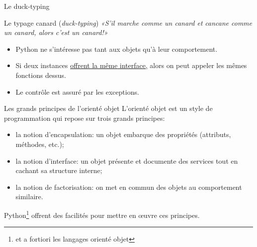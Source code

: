 \documentclass[dvipsnames]{beamer}
\begin{document}
\begin{frame}
    [fragile]{Le duck-typing}
    \begin{alertblock}
        {Le typage canard (\emph{duck-typing})}
        \emph{«S'il marche comme un canard et cancane comme un canard, alors
            c'est un canard!»}
    \end{alertblock}
    \vspace{-1em}
    \begin{itemize}
        \item Python ne s'intéresse pas tant aux objets qu'à leur comportement.
        \item Si deux instances \alert{\underline{{\normalfont \color{black}
                              offrent la même} interface,}} alors on peut
              appeler les mêmes fonctions dessus.
        \item Le contrôle est assuré par les exceptions.\\
              \mbox{}\hfill\PointingHand{} \quad\mbox{}
    \end{itemize}

\end{frame}

\begin{frame}
    [fragile]{Les grands principes de l'orienté objet}
    L'orienté objet est un style de programmation qui repose sur trois
    grands principes:
    \begin{itemize}
        \item la notion d'\alert{encapsulation}: un objet embarque des
              propriétés (attributs, méthodes, etc.);
        \item la notion d'\alert{interface}: un objet présente et documente des
              services tout en cachant sa structure interne;
        \item la notion de \alert{factorisation}: on met en commun des objets au
              comportement similaire.
    \end{itemize}

    Python\footnote{et a fortiori les langages orienté objet} offrent des
    facilités pour mettre en œuvre ces principes.
\end{frame}

\end{document}

